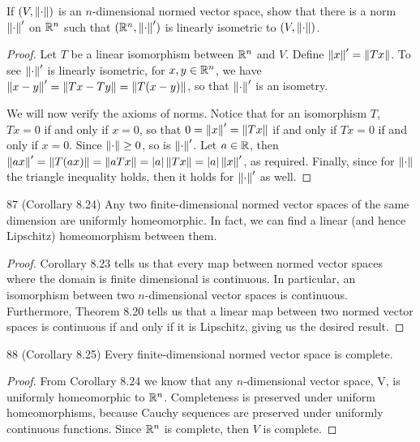 \begin{exercise}{86}
If $(V,\left\lVert \cdot\right\rVert)$ is an $n$-dimensional normed vector space, show that there is a norm $\left\lVert \cdot\right\rVert'$ on $\mathbb{R}^n$ such that $(\mathbb{R}^n,\left\lVert \cdot\right\rVert')$ is linearly isometric to $(V,\left\lVert \cdot\right\rVert)$.
\end{exercise}
\begin{proof}
Let $T$ be a linear isomorphism between $\mathbb{R}^n$ and $V$.
Define $\left\lVert x\right\rVert' = \left\lVert Tx\right\rVert$.
To see $\left\lVert \cdot\right\rVert'$ is linearly isometric, for $x,y\in \mathbb{R}^n$, we have $\left\lVert x-y\right\rVert' = \left\lVert Tx - Ty\right\rVert = \left\lVert T(x-y)\right\rVert$, so that $\left\lVert \cdot\right\rVert'$ is an isometry.

We will now verify the axioms of norms.
Notice that for an isomorphism $T$, $Tx=0$ if and only if $x=0$, so that $0 = \left\lVert x\right\rVert' = \left\lVert Tx\right\rVert$ if and only if $Tx=0$ if and only if $x=0$.
Since $\left\lVert \cdot\right\rVert\geq 0$, so is $\left\lVert \cdot\right\rVert'$.
Let $a\in\mathbb{R}$, then $\left\lVert ax\right\rVert' = \left\lVert T(ax)\right\rVert = \left\lVert aTx\right\rVert = \left\lvert a\right\rvert\left\lVert Tx\right\rVert = \left\lvert a\right\rvert\left\lVert x\right\rVert'$, as required.
Finally, since for $\left\lVert \cdot\right\rVert$ the triangle inequality holds, then it holds for $\left\lVert \cdot\right\rVert'$ as well.
\end{proof} 

\begin{exercise}{87 (Corollary 8.24)}
Any two finite-dimensional normed vector spaces of the same dimension are uniformly homeomorphic.
In fact, we can find a linear (and hence Lipschitz) homeomorphism between them.
\end{exercise}
\begin{proof}
Corollary 8.23 tells us that every map between normed vector spaces where the domain is finite dimensional is continuous.
In particular, an isomorphism between two $n$-dimensional vector spaces is continuous.
Furthermore, Theorem 8.20 tells us that a linear map between two normed vector spaces is continuous if and only if it is Lipschitz, giving us the desired result.
\end{proof} 

\begin{exercise}{88 (Corollary 8.25)}
Every finite-dimensional normed vector space is complete.
\end{exercise}
\begin{proof}
From Corollary 8.24 we know that any $n$-dimensional vector space, V, is uniformly homeomorphic to $\mathbb{R}^n$.
Completeness is preserved under uniform homeomorphisms, because Cauchy sequences are preserved under uniformly continuous functions.
Since $\mathbb{R}^n$ is complete, then $V$ is complete.
\end{proof} 

